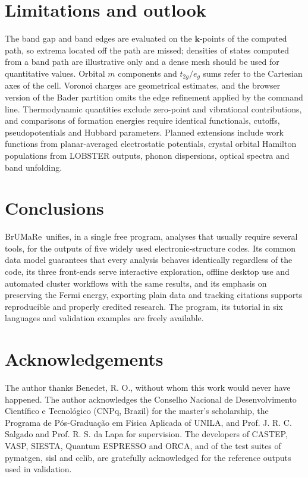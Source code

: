 \documentclass[11pt,a4paper]{article}
\newcommand{\BMR}{\textsf{BrUMa\textcolor[HTML]{B26B00}{Re}}}
\begin{document}
\section{Limitations and outlook}
The band gap and band edges are evaluated on the $\bm{k}$-points of the computed path, so extrema located off the path are missed; densities of states computed from a band path are illustrative only and a dense mesh should be used for quantitative values. Orbital $m$ components and $t_{2g}/e_g$ sums refer to the Cartesian axes of the cell. Voronoi charges are geometrical estimates, and the browser version of the Bader partition omits the edge refinement applied by the command line. Thermodynamic quantities exclude zero-point and vibrational contributions, and comparisons of formation energies require identical functionals, cutoffs, pseudopotentials and Hubbard parameters. Planned extensions include work functions from planar-averaged electrostatic potentials, crystal orbital Hamilton populations from LOBSTER outputs, phonon dispersions, optical spectra and band unfolding.

\section{Conclusions}
\BMR\ unifies, in a single free program, analyses that usually require several tools, for the outputs of five widely used electronic-structure codes. Its common data model guarantees that every analysis behaves identically regardless of the code, its three front-ends serve interactive exploration, offline desktop use and automated cluster workflows with the same results, and its emphasis on preserving the Fermi energy, exporting plain data and tracking citations supports reproducible and properly credited research. The program, its tutorial in six languages and validation examples are freely available.

\section*{Acknowledgements}
The author thanks Benedet, R. O., without whom this work would never have happened. The author acknowledges the Conselho Nacional de Desenvolvimento Científico e Tecnológico (CNPq, Brazil) for the master's scholarship, the Programa de Pós-Graduação em Física Aplicada of UNILA, and Prof. J. R. C. Salgado and Prof. R. S. da Lapa for supervision. The developers of CASTEP, VASP, SIESTA, Quantum ESPRESSO and ORCA, and of the test suites of pymatgen, sisl and cclib, are gratefully acknowledged for the reference outputs used in validation.
\end{document}
